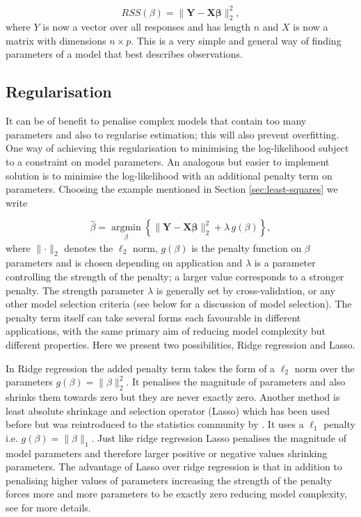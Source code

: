 \begin{equation}
  \label{eq:rss-ls}
  RSS(\beta) = \lVert \mathbf{Y} - \mathbf{X}\mathbf{\beta}\lVert^2_2,
\end{equation}
where $Y$ is now a vector over all responses and has length $n$ and $X$ is now a matrix with dimensions $n \times p$. This is a very simple and general way of finding parameters of a model that best describes observations. 

\subsection{Regularisation}
\label{sec:penalisation}

It can be of benefit to penalise complex models that contain too many parameters and also to regularise estimation; this will also prevent overfitting. One way of achieving this regularisation to minimising the log-likelihood subject to a constraint on model parameters. An analogous but easier to implement solution is to minimise the log-likelihood with an additional penalty term on parameters. Choosing the example mentioned in Section \ref{sec:least-squares} we write

\begin{equation}
  \label{eq:pen-log-lik}
  \hat{\beta} = \underset{\beta}{\operatorname{argmin}}  \left\lbrace \lVert \mathbf{Y} - \mathbf{X}\mathbf{\beta}\lVert^2_2 + \lambda\, g(\beta) \right\rbrace,
\end{equation}
where $\lVert  \cdot \rVert_2$ denotes the $\ell_2$ norm, $g(\beta)$ is the penalty function on $\beta$ parameters and is chosen depending on application and $\lambda$ is a parameter controlling the strength of the penalty; a larger value corresponds to a stronger penalty. The strength parameter $\lambda$ is generally set by cross-validation, or any other model selection criteria (see below for a discussion of model selection). The penalty term itself can take several forms each favourable in different applications, with the same primary aim of reducing model complexity but different properties. Here we present two possibilities, Ridge regression and Lasso.

In Ridge regression the added penalty term takes the form of a $\ell_2$ norm over the parameters $g(\beta) = \lVert \beta \rVert_2^2$. It penalises the magnitude of parameters and also shrinks them towards zero but they are never exactly zero. Another method is least absolute shrinkage and selection operator (Lasso) which has been used before but was reintroduced to the statistics community by \cite{Tibshirani:1996wba}. It uses a $\ell_1$ penalty i.e. $g(\beta) = \lVert \beta \rVert_1$. Just like ridge regression Lasso penalises the magnitude of model parameters and therefore larger positive or negative values shrinking parameters. The advantage of Lasso over ridge regression is that in addition to penalising higher values of parameters increasing the strength of the penalty forces more and more parameters to be exactly zero reducing model complexity, see \cite{hastie2001elements} for more details. 

